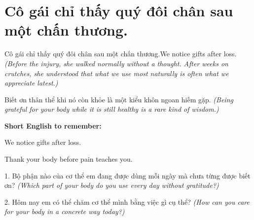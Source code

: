 \section{Cô gái chỉ thấy quý đôi chân sau một chấn thương.}
\begin{truyen}{Cô gái chỉ thấy quý đôi chân sau một chấn thương.}{We notice gifts after loss.}
\textit{(Before the injury, she walked normally without a thought. After weeks on crutches, she understood that what we use most naturally is often what we appreciate latest.)}
\end{truyen}
\begin{baihoc}
Biết ơn thân thể khi nó còn khỏe là một kiểu khôn ngoan hiếm gặp.
\textit{(Being grateful for your body while it is still healthy is a rare kind of wisdom.)}
\end{baihoc}
\begin{ghinhoanh}
\textbf{Short English to remember:}

We notice gifts after loss.

Thank your body before pain teaches you.
\end{ghinhoanh}
\begin{tuhocnhanh}
1. Bộ phận nào của cơ thể em đang được dùng mỗi ngày mà chưa từng được biết ơn? \textit{(Which part of your body do you use every day without gratitude?)}

2. Hôm nay em có thể chăm cơ thể mình bằng việc gì cụ thể? \textit{(How can you care for your body in a concrete way today?)}
\end{tuhocnhanh}
\ngancach


